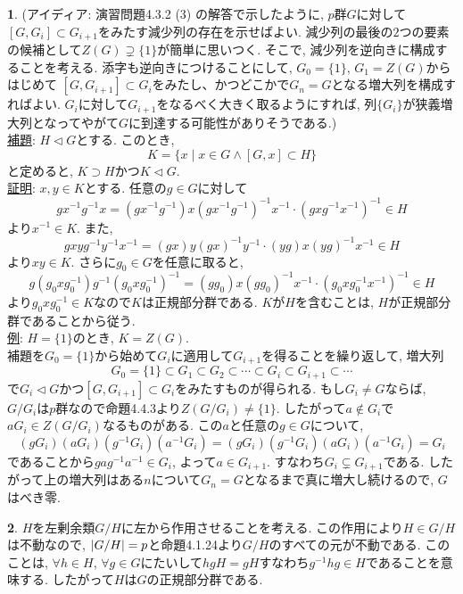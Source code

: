 \documentclass{article}
\theoremstyle{definition}
\newtheorem{ans}{}
\numberwithin{ans}{subsection}
\DeclarePairedDelimiter{\order}{\lvert}{\rvert}
\begin{document}
\begin{ans}
  (アイディア: 演習問題4.3.2 (3) の解答で示したように, $p$群$G$に対して$[G, G_i] \subset G_{i+1}$をみたす減少列の存在を示せばよい.
  減少列の最後の$2$つの要素の候補として$Z(G) \supsetneq \{1\}$が簡単に思いつく.
  そこで, 減少列を逆向きに構成することを考える. 添字も逆向きにつけることにして, $G_0 = \{1\}$, $G_1 = Z(G)$からはじめて
  $[G, G_{i+1}] \subset G_{i}$をみたし、かつどこかで$G_n = G$となる増大列を構成すればよい.
  $G_{i}$に対して$G_{i+1}$をなるべく大きく取るようにすれば, 列$\{G_i\}$が狭義増大列となってやがて$G$に到達する可能性がありそうである.)\\

  \underline{補題}: $H \triangleleft G$とする. このとき,
  \[
    K = \{x \mid x \in G \land [G, x] \subset H \}
  \]
  と定めると, $K \supset H$かつ$K \triangleleft G$.\\

  \underline{証明}: $x, y \in K$とする. 任意の$g \in G$に対して
  \[
    gx^{-1}g^{-1}x = (gx^{-1}g^{-1})x(gx^{-1}g^{-1})^{-1}x^{-1} \cdot (gxg^{-1}x^{-1})^{-1} \in H
  \]
  より$x^{-1} \in K$. また,
  \[
    gxyg^{-1}y^{-1}x^{-1} = (gx)y(gx)^{-1}y^{-1} \cdot (yg)x(yg)^{-1}x^{-1} \in H
  \]
  より$xy \in K$. さらに$g_0 \in G$を任意に取ると,
  \[
    g(g_0xg_0^{-1})g^{-1}(g_0xg_0^{-1})^{-1} = (gg_0)x(gg_0)^{-1}x^{-1} \cdot (g_0xg_0^{-1}x^{-1})^{-1} \in H
  \]
  より$g_0xg_0^{-1} \in K$なので$K$は正規部分群である.
  $K$が$H$を含むことは, $H$が正規部分群であることから従う.\\

  \underline{例}: $H = \{1\}$のとき, $K = Z(G)$.\\

  補題を$G_0 = \{1\}$から始めて$G_i$に適用して$G_{i+1}$を得ることを繰り返して,
  増大列
  \[
    G_0 = \{1\} \subset G_1 \subset G_2 \subset \cdots \subset G_i \subset G_{i+1} \subset \cdots
  \]
  で$G_i \triangleleft G$かつ$[G, G_{i+1}] \subset G_{i}$をみたすものが得られる.
  もし$G_i \neq G$ならば, $G/G_i$は$p$群なので命題4.4.3より$Z(G/G_i) \neq \{1\}$.
  したがって$a \notin G_i$で$aG_i \in Z(G/G_i)$なるものがある. この$a$と任意の$g \in G$について,
  \[
    (gG_i)(aG_i)(g^{-1}G_i)(a^{-1}G_i) = (gG_i)(g^{-1}G_i)(aG_i)(a^{-1}G_i) = G_i
  \]
  であることから$gag^{-1}a^{-1} \in G_i$, よって$a \in G_{i+1}$.
  すなわち$G_i \subsetneq G_{i+1}$である.
  したがって上の増大列はある$n$について$G_n = G$となるまで真に増大し続けるので, $G$はべき零.
\end{ans}

\begin{ans}
  $H$を左剰余類$G/H$に左から作用させることを考える.
  この作用により$H \in G/H$は不動なので, $\order{G/H} = p$と命題4.1.24より$G/H$のすべての元が不動である.
  このことは, $\forall h \in H$, $\forall g \in G$にたいして$hgH = gH$すなわち$g^{-1}hg \in H$であることを意味する.
  したがって$H$は$G$の正規部分群である.
\end{ans}
\end{document}

